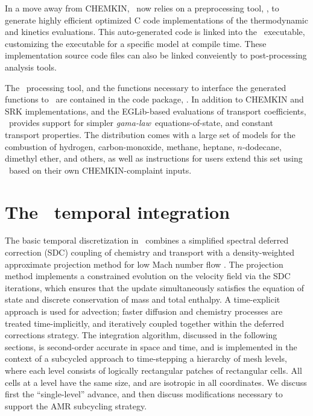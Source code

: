 In a move away from CHEMKIN, \pelelm\ now relies on a preprocessing tool, \fuego, to generate highly efficient optimized C code implementations of the thermodynamic and kinetics evaluations.  This auto-generated code is linked into the \pelelm\ executable, customizing the executable for a specific model at compile time.  These implementation source code files can also be linked conveiently to post-processing analysis tools.

The \fuego\ processing tool, and the functions necessary to interface the generated functions to \pelelm\ are contained in the code package, \pelephysics.  In addition to CHEMKIN and SRK implementations, and the EGLib-based evaluations of transport coefficients, \pelephysics\ provides support for simpler \textit{gama-law}\ equations-of-state, and constant transport properties.  The distribution comes with a large set of models for the combustion of hydrogen, carbon-monoxide, methane, heptane, $n$-dodecane, dimethyl ether, and others, as well as instructions for users extend this set using \fuego\ based on their own CHEMKIN-complaint inputs.

\section{The \pelelm\ temporal integration}
The basic temporal discretization in \pelelm\ combines a simplified spectral deferred correction (SDC) coupling of chemistry and transport \cite{LMC_SDC} with a density-weighted approximate projection method for low Mach number flow \cite{DayBell:2000}.  The projection method implements a constrained evolution on the velocity field via the SDC iterations, which ensures that the update simultaneously satisfies the  equation of state and discrete conservation of mass and total enthalpy.
A time-explicit approach is used for advection; faster diffusion and chemistry processes are treated time-implicitly, and iteratively coupled together within the deferred corrections strategy. The integration algorithm, discussed in the following sections, is second-order accurate in space and time, and is implemented in the context of a subcycled approach to time-stepping a hierarchy of mesh levels, where each level consists of logically rectangular patches of rectangular cells.  All cells at a level have the same size, and are isotropic in all coordinates.  We discuss first the ``single-level'' advance, and then discuss modifications necessary to support the AMR subcycling strategy.

